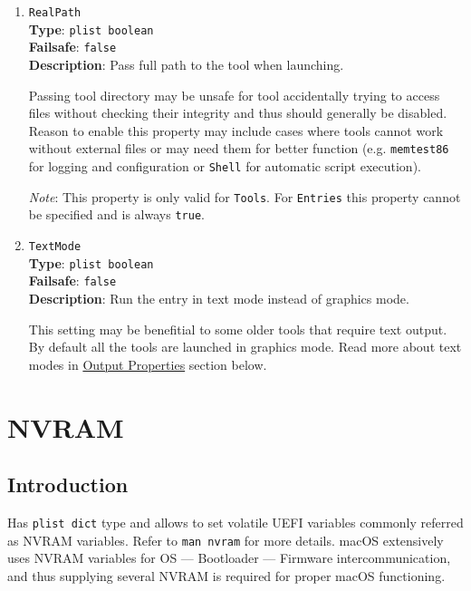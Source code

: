 \documentclass[]{article}
\begin{document}
\begin{enumerate}
\item
  \texttt{RealPath}\\
  \textbf{Type}: \texttt{plist\ boolean}\\
  \textbf{Failsafe}: \texttt{false}\\
  \textbf{Description}: Pass full path to the tool when launching.

  Passing tool directory may be unsafe for tool accidentally trying to access
  files without checking their integrity and thus should generally be disabled.
  Reason to enable this property may include cases where tools cannot work
  without external files or may need them for better function (e.g.
  \texttt{memtest86} for logging and configuration or \texttt{Shell} for
  automatic script execution).

  \emph{Note}: This property is only valid for \texttt{Tools}. For \texttt{Entries}
  this property cannot be specified and is always \texttt{true}.

\item
  \texttt{TextMode}\\
  \textbf{Type}: \texttt{plist\ boolean}\\
  \textbf{Failsafe}: \texttt{false}\\
  \textbf{Description}: Run the entry in text mode instead of graphics mode.

  This setting may be benefitial to some older tools that require text output.
  By default all the tools are launched in graphics mode. Read more about text
  modes in \hyperref[uefioutputprops]{Output Properties} section below.

\end{enumerate}

\section{NVRAM}\label{nvram}

\subsection{Introduction}\label{nvramintro}

Has \texttt{plist\ dict} type and allows to set volatile UEFI variables
commonly referred as NVRAM variables. Refer to \texttt{man\ nvram} for
more details. macOS extensively uses NVRAM variables for OS --- Bootloader
--- Firmware intercommunication, and thus supplying several NVRAM is
required for proper macOS functioning.
\end{document}
